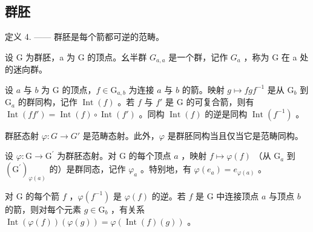 \subsection{群胚}

定义 4. —— 群胚是每个箭都可逆的范畴。

设 G 为群胚，a 为 G 的顶点。幺半群 \(G_{a,a}\) 是一个群，记作 \(G_{a}\) ，称为 G 在 a 处的迷向群。

设 \(a\) 与 \(b\) 为 G 的顶点，\(f \in \mathrm{G}_{a,b}\) 为连接 \(a\) 与 \(b\) 的箭。映射 \(g \mapsto fgf^{-1}\) 是从 \(\mathrm{G}_b\) 到 \(\mathrm{G}_a\) 的群同构，记作 \(\operatorname{Int}(f)\) 。若 \(f\) 与 \(f'\) 是 G 的可复合箭，则有 \(\operatorname{Int}(ff') = \operatorname{Int}(f) \circ \operatorname{Int}(f')\) 。同构 \(\operatorname{Int}(f)\) 的逆是同构 \(\operatorname{Int}(f^{-1})\) 。

群胚态射 \(\varphi\colon G\to G'\) 是范畴态射。此外，\(\varphi\) 是群胚同构当且仅当它是范畴同构。

设 \(\varphi\colon\mathrm{G}\to\mathrm{G}^{\prime}\) 为群胚态射。对 G 的每个顶点 \(a\) ，映射 \(f\mapsto\varphi(f)\) （从 \(\mathrm{G}_{a}\) 到 \((\mathrm{G}^{\prime})_{\varphi(a)}\) 的）是群同态，记作 \(\varphi_{a}\) 。特别地，有 \(\varphi(e_{a})=e_{\varphi(a)}\) 。

对 G 的每个箭 \(f\) ，\(\varphi(f^{-1})\) 是 \(\varphi(f)\) 的逆。若 \(f\) 是 G 中连接顶点 \(a\) 与顶点 \(b\) 的箭，则对每个元素 \(g \in \mathrm{G}_b\) ，有关系 \(\operatorname{Int}(\varphi(f))(\varphi(g)) = \varphi(\operatorname{Int}(f)(g))\) 。

